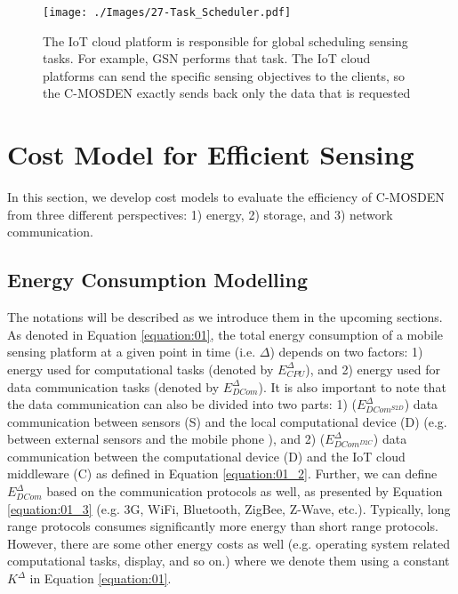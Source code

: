 \documentclass[journal]{IEEEtran}
\begin{document}
\begin{figure}[t]
 \centering
 \vspace{-0.43cm}
 \texttt{[image: ./Images/27-Task\_Scheduler.pdf]}
\caption{The IoT cloud platform is responsible for global scheduling sensing tasks. For example, GSN performs that task.  The IoT cloud platforms can send the specific sensing objectives to the clients, so the C-MOSDEN exactly sends back only the data that is requested}
 \label{Figure:Task_Scheduler}	
\end{figure}









\section{Cost Model for Efficient Sensing}
\label{sec:Model}

In this section, we develop cost models to evaluate the efficiency of C-MOSDEN from three different perspectives: 1) energy, 2) storage, and 3) network communication.








\subsection{Energy Consumption Modelling}
\label{sec:Energy}

 

The notations will be described  as we introduce them in the upcoming sections. As denoted in Equation \ref{equation:01}, the total energy consumption of a mobile sensing platform at a given point in time (i.e. $\Delta$) depends on two factors: 1) energy used for computational tasks (denoted by $E_{CPU}^{\Delta}$), and 2) energy used for data communication tasks (denoted by $E_{DCom}^{\Delta}$). It is also important to note that the data communication can also be divided into two parts: 1) ($E_{DCom^{S2D}}^{\Delta}$) data communication between sensors (S) and the local computational device (D)  (e.g.  between external sensors and the mobile phone \cite{ZMPB001}), and 2) ($E_{DCom^{D2C}}^{\Delta}$) data communication between the computational device (D) and the IoT cloud  middleware (C) as defined in Equation \ref{equation:01_2}. Further, we can define $E_{DCom}^{\Delta}$ based on the communication protocols as well, as presented by Equation \ref{equation:01_3} (e.g. 3G, WiFi, Bluetooth, ZigBee, Z-Wave, etc.). Typically, long range protocols consumes significantly more energy than short range protocols. However, there are some other energy costs as well (e.g. operating system related computational tasks, display, and so on.) where we denote them using a constant $K^{\Delta}$ in Equation \ref{equation:01}.
\end{document}
